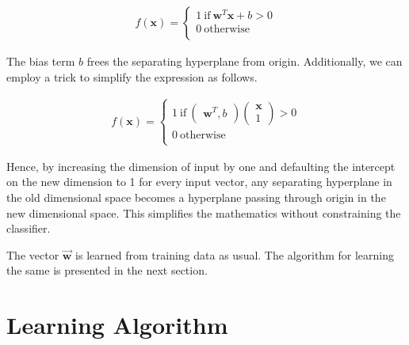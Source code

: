 \documentclass[11pt, a4paper]{article}
\begin{document}
\begin{align*}
	f(\boldsymbol{x}) = \left\{                           
	\begin{array}{ll}                                     
	1\ \text{if}\ \boldsymbol{w}^T \boldsymbol{x} + b > 0 \\
	0\ \text{otherwise}                                   \\
	\end{array}                                           
	\right.                                               
\end{align*}

The bias term $b$ frees the separating hyperplane from origin. Additionally, we can employ a trick to simplify the expression as follows.

\begin{align*}
	f(\boldsymbol{x}) = \left\{                                                                    
	\begin{array}{ll}                                                                              
	1\ \text{if}\ \begin{pmatrix} \boldsymbol{w}^T, b \end{pmatrix} \begin{pmatrix} \boldsymbol{x} \\ 
	1 \end{pmatrix} > 0                                                                            \\
	0\ \text{otherwise}                                                                            \\
	\end{array}                                                                                    
	\right.                                                                                        
\end{align*}

Hence, by increasing the dimension of input by one and defaulting the intercept on the new dimension to 1 for every input vector, any separating hyperplane in the old dimensional space 
becomes a hyperplane passing through origin in the new dimensional space. This simplifies the mathematics without constraining the classifier.

The vector $\vec{\boldsymbol{w}}$ is learned from training data as usual. The algorithm for learning the same is presented in the next section. 

\section{Learning Algorithm}
\end{document}
